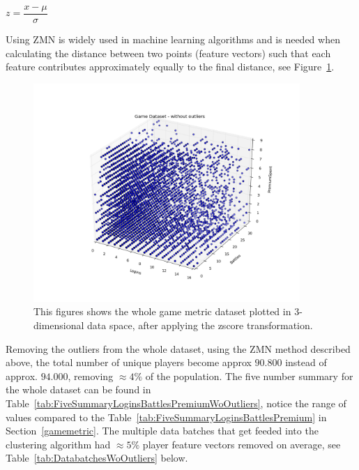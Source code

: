 \begin{center}
$z = \dfrac{x  - \mu}{\sigma}$ 
\end{center}


Using ZMN is widely used in machine learning algorithms and is needed when calculating the distance between two points (feature vectors) such that each feature contributes approximately equally to the final distance, see Figure~\ref{fig:DatasetZdataWithoutOutliers}.

\begin{figure}[here]
\centerline{\includegraphics[trim = 10mm 20mm 10mm 30mm, clip, width=0.9\textwidth]{Figures/DatasetZdataWithoutOutliers.png}}
\caption{This figures shows the whole game metric dataset plotted in $3$-dimensional data space, after applying the zscore transformation.}
\label{fig:DatasetZdataWithoutOutliers}
\end{figure}

Removing the outliers from the whole dataset, using the ZMN method described above, the total number of unique players become approx $90.800$ instead of approx. $94.000$, removing $\approx 4\%$ of the population. The five number summary for the whole dataset can be found in Table~\ref{tab:FiveSummaryLoginsBattlesPremiumWoOutliers}, notice the range of values compared to the Table~\ref{tab:FiveSummaryLoginsBattlesPremium} in Section~\ref{gamemetric}. The multiple data batches that get feeded into the clustering algorithm had $\approx 5\%$ player feature vectors removed on average, see Table~\ref{tab:DatabatchesWoOutliers} below.

